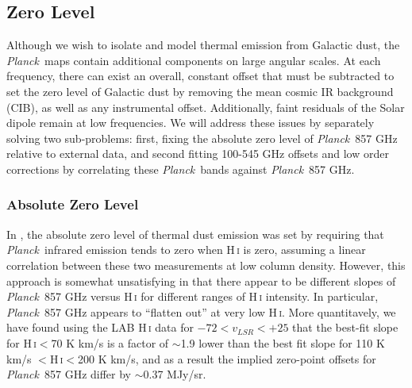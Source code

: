 \documentclass{emulateapj}
\newcommand{\PLANCK}{{\it Planck}}
\begin{document}
\subsection{Zero Level}
\label{sec:zp}



Although we wish to isolate and model thermal emission from Galactic dust, the
\PLANCK~maps contain additional components on large angular scales. At each 
frequency, there can exist an overall, constant offset that must be subtracted 
to set the zero level of Galactic dust by removing the mean cosmic IR 
background (CIB), as well as any instrumental offset. Additionally, faint 
residuals of the Solar dipole remain at low frequencies. We will address these 
issues by separately solving two sub-problems: first, fixing the absolute zero 
level of \PLANCK~857 GHz relative to external data, and second fitting 
100-545 GHz offsets and low order corrections by correlating these 
\PLANCK~bands against \PLANCK~857 GHz.

\subsubsection{Absolute Zero Level}
\label{sec:zp_abs}
In \cite{planckdust}, the absolute zero level of thermal dust emission was set 
by requiring that \PLANCK~infrared emission tends to zero when H\,\textsc{i} is
zero, assuming a linear correlation between these two measurements at low 
column density. However, this approach is somewhat unsatisfying in that there 
appear to be different slopes of \PLANCK~857 GHz versus H\,\textsc{i} for 
different ranges of H\,\textsc{i} intensity. In particular, \PLANCK~857 GHz 
appears to ``flatten out'' at very low H\,\textsc{i}. More quantitavely, we 
have found using the LAB H\,\textsc{i} data \citep{lab} for 
$-72$$<$$v_{LSR}$$<$$+25$ that the best-fit slope for H\,\textsc{i}$<$70 K km/s
is a factor of $\sim$1.9 lower than the best fit slope for 110 K km/s 
$<$H\,\textsc{i}$<$200 K km/s, and as a result the implied zero-point offsets 
for \PLANCK~857 GHz differ by $\sim$0.37 MJy/sr.

\end{document}
